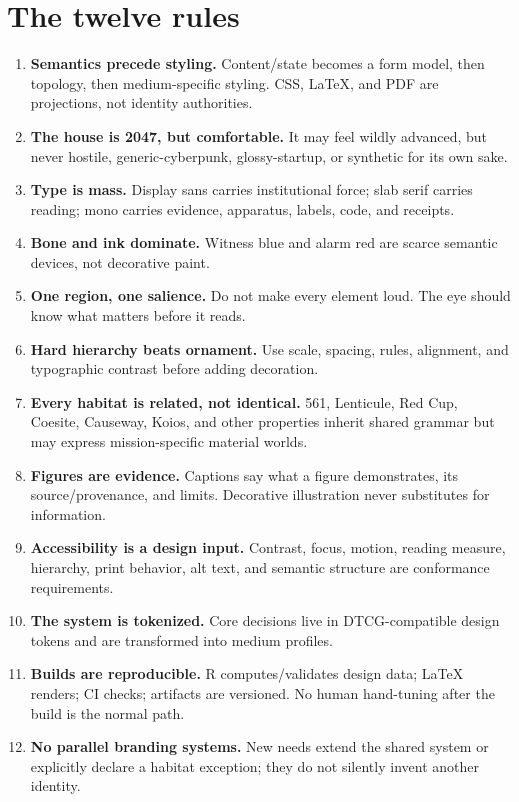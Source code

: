\documentclass[11pt,twoside,openany]{report}
\begin{document}
\chapter*{The twelve rules}
\vspace{1em}

\begin{enumerate}
  \item \textbf{Semantics precede styling.} Content/state becomes a form model, then topology, then medium-specific styling. CSS, LaTeX, and PDF are projections, not identity authorities.
  \item \textbf{The house is 2047, but comfortable.} It may feel wildly advanced, but never hostile, generic-cyberpunk, glossy-startup, or synthetic for its own sake.
  \item \textbf{Type is mass.} Display sans carries institutional force; slab serif carries reading; mono carries evidence, apparatus, labels, code, and receipts.
  \item \textbf{Bone and ink dominate.} Witness blue and alarm red are scarce semantic devices, not decorative paint.
  \item \textbf{One region, one salience.} Do not make every element loud. The eye should know what matters before it reads.
  \item \textbf{Hard hierarchy beats ornament.} Use scale, spacing, rules, alignment, and typographic contrast before adding decoration.
  \item \textbf{Every habitat is related, not identical.} 561, Lenticule, Red Cup, Coesite, Causeway, Koios, and other properties inherit shared grammar but may express mission-specific material worlds.
  \item \textbf{Figures are evidence.} Captions say what a figure demonstrates, its source/provenance, and limits. Decorative illustration never substitutes for information.
  \item \textbf{Accessibility is a design input.} Contrast, focus, motion, reading measure, hierarchy, print behavior, alt text, and semantic structure are conformance requirements.
  \item \textbf{The system is tokenized.} Core decisions live in DTCG-compatible design tokens and are transformed into medium profiles.
  \item \textbf{Builds are reproducible.} R computes/validates design data; LaTeX renders; CI checks; artifacts are versioned. No human hand-tuning after the build is the normal path.
  \item \textbf{No parallel branding systems.} New needs extend the shared system or explicitly declare a habitat exception; they do not silently invent another identity.
\end{enumerate}
\end{document}
